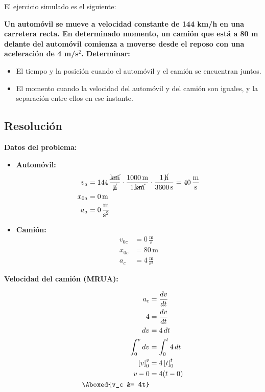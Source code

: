 El ejercicio simulado es el siguiente:

\textbf{Un automóvil se mueve a velocidad constante de 144 km/h en una carretera recta. En determinado momento, un camión que está a 80 m delante del automóvil comienza a moverse desde el reposo con una aceleración de 4 m/s$^2$. Determinar:}
\begin{itemize}
    \item[a)] El tiempo y la posición cuando el automóvil y el camión se encuentran juntos.
    \item[b)] El momento cuando la velocidad del automóvil y del camión son iguales, y la separación entre ellos en ese instante.
\end{itemize}

\subsection{Resolución}

\textbf{Datos del problema:}

\begin{itemize}
    \item \textbf{Automóvil:}
    \begin{align*}
        v_a &= 144\,\frac{\cancel{\text{km}}}{\cancel{\text{h}}} \cdot \frac{1000\,\text{m}}{1\,\cancel{\text{km}}} \cdot \frac{1\,\cancel{\text{h}}}{3600\,\text{s}} = 40\,\frac{\text{m}}{\text{s}} \\
        x_{0a} &= 0\,\text{m} \\
        a_a &= 0\,\frac{\text{m}}{\text{s}^2}
    \end{align*}

    \item \textbf{Camión:}
    \begin{align*}
        v_{0c} &= 0\,\frac{\text{m}}{\text{s}} \\
        x_{0c} &= 80\,\text{m} \\
        a_c &= 4\,\frac{\text{m}}{\text{s}^2}
    \end{align*}
\end{itemize}

\textbf{Velocidad del camión (MRUA):}
\vspace{-20pt}

\begin{align*}
a_c &= \frac{dv}{dt} \\
4 &= \frac{dv}{dt} \\
dv &= 4\,dt \\
\int_{0}^{v} dv &= \int_{0}^{t} 4\,dt \\
\left[v\right]_{0}^{v} &= 4\left[t\right]_{0}^{t} \\
v - 0 &= 4(t - 0) \\
\Aboxed{v_c &= 4t}
\end{align*}

